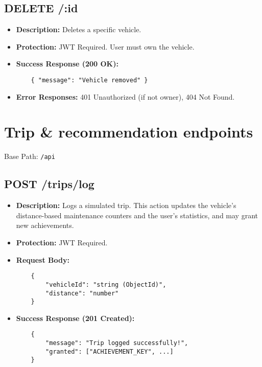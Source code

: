 \subsection{DELETE /:id}
\begin{itemize}
    \item \textbf{Description:} Deletes a specific vehicle.
    \item \textbf{Protection:} JWT Required. User must own the vehicle.
    \item \textbf{Success Response (200 OK):}
    \begin{verbatim}
    { "message": "Vehicle removed" }
    \end{verbatim}
    \item \textbf{Error Responses:} 401 Unauthorized (if not owner), 404 Not Found.
\end{itemize}

\section{Trip \& recommendation endpoints}
Base Path: \texttt{/api}

\subsection{POST /trips/log}
\begin{itemize}
    \item \textbf{Description:} Logs a simulated trip. This action updates the vehicle's distance-based maintenance counters and the user's statistics, and may grant new achievements.
    \item \textbf{Protection:} JWT Required.
    \item \textbf{Request Body:}
    \begin{verbatim}
    {
        "vehicleId": "string (ObjectId)",
        "distance": "number"
    }
    \end{verbatim}
    \item \textbf{Success Response (201 Created):}
    \begin{verbatim}
    {
        "message": "Trip logged successfully!",
        "granted": ["ACHIEVEMENT_KEY", ...]
    }
    \end{verbatim}
\end{itemize}

